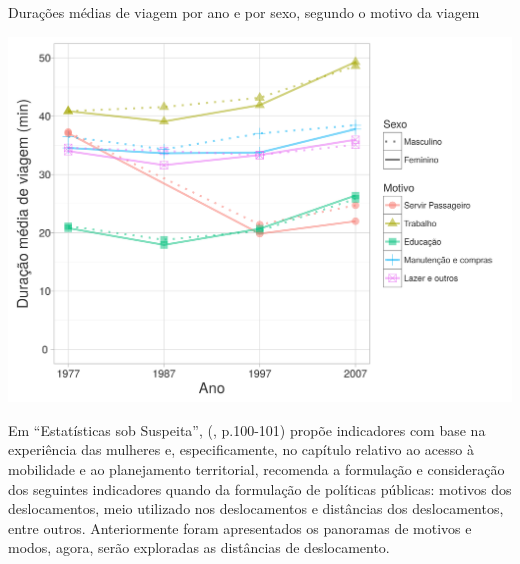 \begin{grafico}[htb]%
    \caption{\label{graf:duracao-motivo}Durações médias de viagem por ano e por sexo, segundo o motivo da viagem}%
    \begin{center}%
        \includegraphics[width=1\textwidth]{./imagens/duracao-motivo.png}%
    \end{center}%
\end{grafico}%


Em “Estatísticas sob Suspeita”,  (\citeyear{CARRASCO2012}, p.100-101) propõe indicadores com base na experiência das mulheres e, especificamente, no capítulo relativo ao acesso à mobilidade e ao planejamento territorial, recomenda a formulação e consideração dos seguintes indicadores quando da formulação de políticas públicas:
motivos dos deslocamentos, meio utilizado nos deslocamentos e distâncias dos deslocamentos, entre outros.
Anteriormente foram apresentados os panoramas de motivos e modos, agora, serão exploradas as distâncias de deslocamento.

